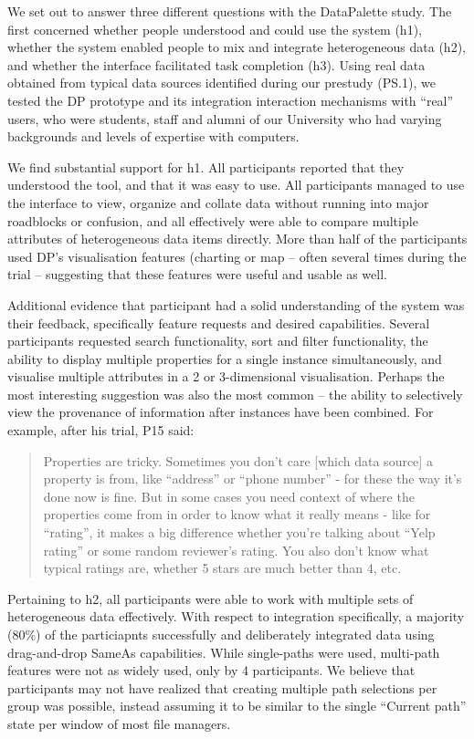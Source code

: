 \documentclass{sigchi}
\begin{document}
We set out to answer three different questions with the DataPalette study. The first concerned whether people understood and could use the system (h1), whether the system enabled people to mix and integrate heterogeneous data (h2), and whether the interface facilitated task completion (h3).  Using real data obtained from typical data sources identified during our prestudy (PS.1), we tested the DP prototype and its integration interaction mechanisms with ``real'' users, who were students, staff and alumni of our University who had varying backgrounds and levels of expertise with computers.

We find substantial support for h1. All participants reported that they understood the tool, and that it was easy to use.   All participants managed to use the interface to view, organize and collate data without running into major roadblocks or confusion, and all effectively were able to compare multiple attributes of heterogeneous data items directly.  More than half of the participants used DP's visualisation features (charting or map -- often several times during the trial -- suggesting that these features were useful and usable as well.  

Additional evidence that participant had a solid understanding of the system was their feedback, specifically feature requests and desired capabilities.  Several participants requested search functionality, sort and filter functionality, the ability to display multiple properties for a single instance simultaneously, and visualise multiple attributes in a 2 or 3-dimensional visualisation.  Perhaps the most interesting suggestion was also the most common -- the ability to selectively view the provenance of information after instances have been combined.  For example, after his trial, P15 said:

\begin{quote}
Properties are tricky. Sometimes you don’t care [which data source] a property is from, like ``address'' or ``phone number'' - for these the way it’s done now is fine. But in some cases you need context of where the properties come from in order to know what it really means - like for ``rating'', it makes a big difference whether you’re talking about ``Yelp rating'' or some random reviewer's rating.  You also don’t know what typical ratings are, whether 5 stars are much better than 4, etc.
\end{quote}

Pertaining to h2, all participants were able to work with multiple sets of heterogeneous data effectively.  With respect to integration specifically, a majority (80\%) of the particiapnts successfully and deliberately integrated data using drag-and-drop SameAs capabilities.  While single-paths were used, multi-path features were not as widely used, only by 4 participants. We believe that participants may not have realized that creating multiple path selections per group was possible, instead assuming it to be similar to the single ``Current path'' state per window of most file managers. 
\end{document}
